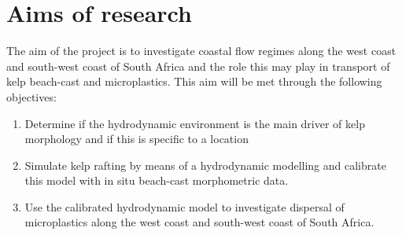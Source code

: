 \documentclass[]{article}
\begin{document}
\hypertarget{aims-of-research}{%
\section{Aims of research}\label{aims-of-research}}

The aim of the project is to investigate coastal flow regimes along the
west coast and south-west coast of South Africa and the role this may
play in transport of kelp beach-cast and microplastics. This aim will be
met through the following objectives:

\begin{enumerate}
\def\labelenumi{\arabic{enumi}.}
\item
  Determine if the hydrodynamic environment is the main driver of kelp
  morphology and if this is specific to a location
\item
  Simulate kelp rafting by means of a hydrodynamic modelling and
  calibrate this model with in situ beach-cast morphometric data.
\item
  Use the calibrated hydrodynamic model to investigate dispersal of
  microplastics along the west coast and south-west coast of South
  Africa.
\end{enumerate}
\end{document}
